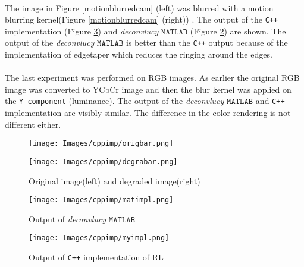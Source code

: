 \documentclass[a4paper]{book}
\begin{document}
\paragraph*{} The image in Figure \ref{motionblurredcam} (left) was blurred with a motion blurring kernel(Figure \ref{motionblurredcam} (right)) . The output of the \texttt{C++} implementation (Figure \ref{myimpl}) and \textit{deconvlucy} $ \mathtt{MATLAB} $ (Figure \ref{matimpl}) are shown. The output of the \textit{deconvlucy }$ \mathtt{MATLAB} $ is better than the \texttt{C++} output because of the implementation of edgetaper which reduces the ringing around the edges\cite{Ber05boundary}.

\paragraph*{} The last experiment was performed on RGB images. As earlier the original RGB image was converted to YCbCr image and then the blur kernel was applied on the \texttt{Y component} (luminance). The output of the  \textit{deconvlucy }$ \mathtt{MATLAB} $ and \texttt{C++} implementation are visibly similar. The difference in the color rendering is not different either.

\begin{figure}[H]
	\begin{minipage}{0.45\textwidth}
		\centering
		\texttt{[image: Images/cppimp/origbar.png]}
	\end{minipage}\hfill
	\begin{minipage}{0.45\textwidth}
		\centering
		\texttt{[image: Images/cppimp/degrabar.png]}
	\end{minipage}
	\centering	
	\caption[Barbara Image \texttt{C++} implementation]{Original image(left) and degraded image(right)}
	\label{degrabar}
\end{figure}

\begin{figure}[H]
	\centering
	\texttt{[image: Images/cppimp/matimpl.png]}
	\caption[$ \mathtt{MATLAB's}$ output ]{Output of \textit{deconvlucy} $ \mathtt{MATLAB} $}
	\label{matimpl}
\end{figure}

\begin{figure}[H]
	\centering
	\texttt{[image: Images/cppimp/myimpl.png]}
	\caption[\texttt{C++} output]{Output of \texttt{C++} implementation of RL}
	\label{myimpl}
\end{figure}
\end{document}
